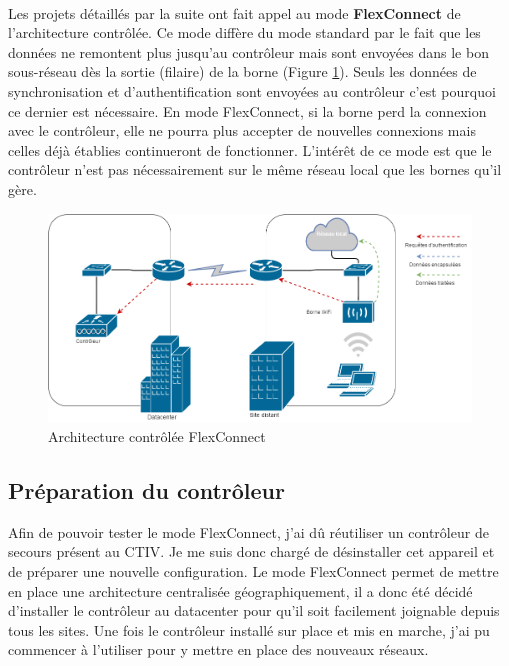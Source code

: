 \documentclass[a4paper,12pt]{report}
\begin{document}
\paragraph{}
Les projets détaillés par la suite ont fait appel au mode \textbf{FlexConnect} de l'architecture contrôlée. Ce mode diffère du mode standard par le fait que les données ne remontent plus jusqu'au contrôleur mais sont envoyées dans le bon sous-réseau dès la sortie (filaire) de la borne (Figure \ref{wifi_flex}). Seuls les données de synchronisation et d'authentification sont envoyées au contrôleur c'est pourquoi ce dernier est nécessaire. En mode FlexConnect, si la borne perd la connexion avec le contrôleur, elle ne pourra plus accepter de nouvelles connexions mais celles déjà établies continueront de fonctionner. L'intérêt de ce mode est que le contrôleur n'est pas nécessairement sur le même réseau local que les bornes qu'il gère.
\begin{figure}[h]
\includegraphics[scale=0.4]{../rapport_photos/wifi_flex.png} 
\caption{Architecture contrôlée FlexConnect}
\label{wifi_flex}
\end{figure}

\subsection{Préparation du contrôleur}\label{controleur}
Afin de pouvoir tester le mode FlexConnect, j'ai dû réutiliser un contrôleur de secours présent au CTIV. Je me suis donc chargé de désinstaller cet appareil et de préparer une nouvelle configuration. Le mode FlexConnect permet de mettre en place une architecture centralisée géographiquement, il a donc été décidé d'installer le contrôleur au datacenter pour qu'il soit facilement joignable depuis tous les sites. Une fois le contrôleur installé sur place et mis en marche, j'ai pu commencer à l'utiliser pour y mettre en place des nouveaux réseaux.
\end{document}
